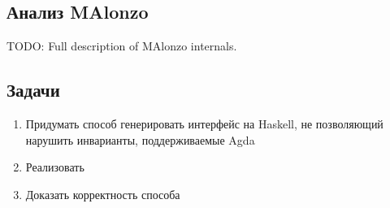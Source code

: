 \subsection{Анализ MAlonzo}

TODO: Full description of MAlonzo internals.

\subsection{Задачи}

\begin{enumerate}
\item Придумать способ генерировать интерфейс на Haskell, не позволяющий нарушить инварианты,
      поддерживаемые Agda
\item Реализовать
\item Доказать корректность способа
\end{enumerate}
